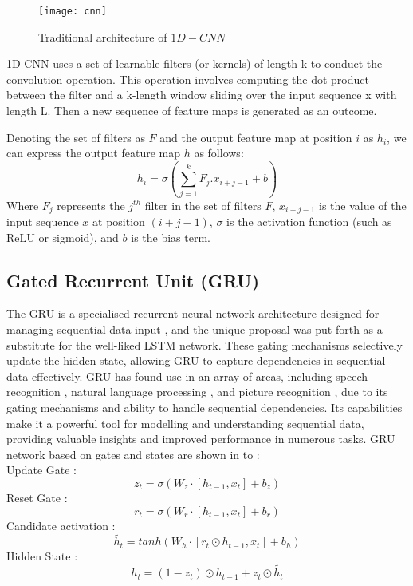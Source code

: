 \begin{figure*}[h!]
  \centering
    \texttt{[image: cnn]}
    \caption{Traditional architecture of $1D-CNN$}\label{CNN}
\end{figure*}

1D CNN uses a set of learnable filters (or kernels) of length k to conduct the convolution operation. This operation involves computing the dot product between the filter and a k-length window sliding over the input sequence x with length L. Then a new sequence of feature maps is generated as an outcome.

\par Denoting the set of filters as $F$ and the output feature map at position $i$ as $h_i$,  we can express the output feature map $h$ as follows: 
\begin{equation}\label{equ: cnn}
        h_i = \sigma \left(\sum_{j=1}^{k}F_{j}.x_{i+j-1}+b \right)
\end{equation}
Where $F_j$ represents the $j^{th}$ filter in the set of filters $F$,  $x_{i+j-1}$ is the value of the input sequence $x$ at position $(i+j-1)$,  $\sigma$ is the activation function (such as ReLU or sigmoid),  and $b$ is the bias term.

\subsection{Gated Recurrent Unit (GRU)}
The GRU is a specialised recurrent neural network architecture designed for managing sequential data input  \cite{chung2014empirical}, and the unique proposal was put forth as a substitute for the well-liked LSTM network. These gating mechanisms selectively update the hidden state,  allowing GRU to capture dependencies in sequential data effectively. GRU has found use in an array of areas,  including speech recognition \cite{shewalkar2019performance, yuan2018auxiliary},  natural language processing \cite{cascianelli2018full, wang2020feature},  and picture recognition \cite{subramanian2022integrated},  due to its gating mechanisms and ability to handle sequential dependencies. Its capabilities make it a powerful tool for modelling and understanding sequential data,  providing valuable insights and improved performance in numerous tasks. GRU network based on gates and states are shown in  to : \\
Update Gate :
\begin{equation} \label{up Gru}
  z_t= \sigma(W_{z}\cdot \left[ h_{t-1}, x_t \right]+b_z )
\end{equation}
Reset Gate : 
\begin{equation}\label{r gru}
 r_t=\sigma (W_{r}\cdot \left[ h_{t-1}, x_t \right]+b_r )
\end{equation}
Candidate activation :
\begin{equation} \label{can gru}
    \tilde{h_t}=tanh(W_h \cdot \left[ r_t \odot h_{t-1}, x_t \right]+b_h)
\end{equation}
Hidden State :  
\begin{equation} \label{hid gru}
  h_t=(1-z_t) \odot h_{t-1}+z_t \odot \tilde{h_t}
\end{equation}



